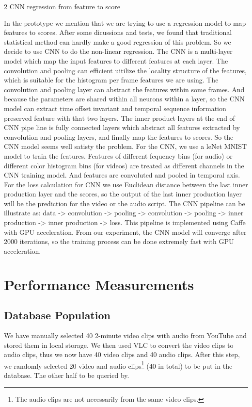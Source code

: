 \documentclass{report}
\begin{document}
2 CNN regression from feature to score

In the prototype we mention that we are trying to use a regression model to map features to scores. After some dicussions and tests, we found that traditional statistical method can hardly make a good regression of this problem. So we decide to use CNN to do the non-linear regression.
The CNN is a multi-layer model which map the input features to different features at each layer. The convolution and pooling can efficient uitilize the locality structure of the features, which is suitable for the histogram per frame features we are using. The convolution and pooling layer can abstract the features within some frames. And because the parameters are shared within all neurons within a layer, so the CNN model can extract time offset invariant and temporal sequence information preserved feature with that two layers. The inner product layers at the end of CNN pipe line is fully connected layers which abstract all features extracted by convolution and pooling layers, and finally map the features to scores. So the CNN model seems well satisty the problem.
For the CNN, we use a leNet MNIST model to train the features. Features of different fequency bins (for audio) or different color histogram bins (for videos) are treated as different channels in the CNN training model. And features are convoluted and pooled in temporal axis. For the loss calculation for CNN we use Euclidean distance between the last inner production layer and the scores, so the output of the last inner production layer will be the prediction for the video or the audio script. The CNN pipeline can be illustrate as:
	data -> convolution -> pooling -> convolution -> pooling -> inner production -> inner production -> loss.
This pipeline is implemented using Caffe with GPU acceleration. From our experiment, the CNN model will converge after 2000 iterations, so the training process can be done extremely fast with GPU acceleration.


\chapter{Performance Measurements}

\section{Database Population}

We have manually selected 40 2-minute video clips with audio from YouTube and stored them in local storage. We then used VLC to convert the video clips to audio clips, thus we now have 40 video clips and 40 audio clips. After this step, we randomly selected 20 video and audio clips\footnote{The audio clips are not necessarily from the same video clips.} (40 in total) to be put in the database. The other half to be queried by.
\end{document}
